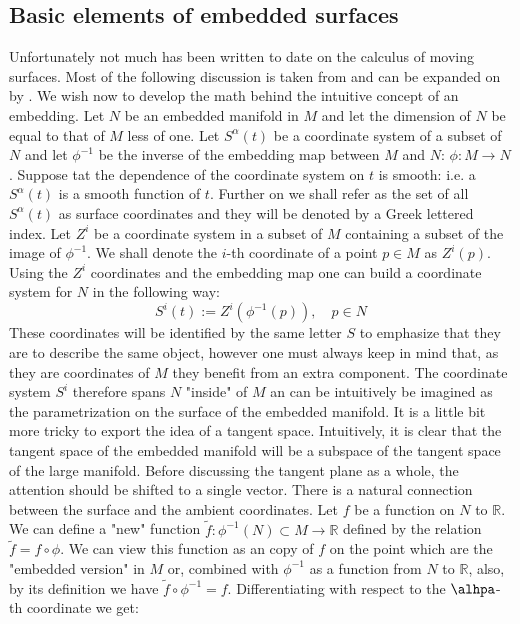 \documentclass[../main.tex]{subfiles}
\begin{document}
    \subsection{Basic elements of embedded surfaces}
        Unfortunately not much has been written to date on the calculus of moving surfaces. Most of the following discussion is taken from and can be expanded on by \cite{grinfeld2016introduction}. We wish now to develop the math behind the intuitive concept of an embedding. Let $N$ be an embedded manifold in $M$ and let the dimension of $N$ be equal to that of $M$ less of one. Let $S^\alpha(t)$ be a coordinate system of a subset of $N$ and let $\phi^{-1}$ be the inverse of the embedding map between $M$ and $N$: $\phi:M\to N$. Suppose tat the dependence of the coordinate system on $t$ is smooth: i.e. a $S^\alpha(t)$ is a smooth function of $t$. Further on we shall refer as the set of all $S^\alpha(t)$ as surface coordinates and they will be denoted by a Greek lettered index. Let $Z^i$ be a coordinate system in a subset of $M$ containing a subset of the image of $\phi^{-1}$. We shall denote the $i$-th coordinate of a point $p\in M$ as $Z^i(p)$. Using the $Z^i$ coordinates and the embedding map one can build a coordinate system for $N$ in the following way:
        \begin{equation}
            S^i(t):=Z^i(\phi^{-1}(p)),\quad p\in N
        \end{equation}
        These coordinates will be identified by the same letter $S$ to emphasize that they are to describe the same object, however one must always keep in mind that, as they are coordinates of $M$ they benefit from an extra component. The coordinate system $S^i$ therefore spans $N$ "inside" of $M$ an can be intuitively be imagined as the parametrization on the surface of the embedded manifold. It is a little bit more tricky to export the idea of a tangent space. Intuitively, it is clear that the tangent space of the embedded manifold will be a subspace of the tangent space of the large manifold. Before discussing the tangent plane as a whole, the attention should be shifted to a single vector. There is a natural connection between the surface and the ambient coordinates. Let $f$ be a function on $N$ to $\mathbb{R}$. We can define a "new" function $\tilde{f}:\phi^{-1}(N)\subset M\to \mathbb{R} $ defined by the relation $\tilde{f}=f\circ\phi $. We can view this function as an copy of $f$ on the point which are the "embedded version" in $M$ or, combined with $\phi^{-1}$ as a function from $N$ to $\mathbb{R}$, also, by its definition we have $\tilde{f}\circ\phi^{-1}=f$. Differentiating with respect to the $\alhpa$-th coordinate we get:
\end{document}
